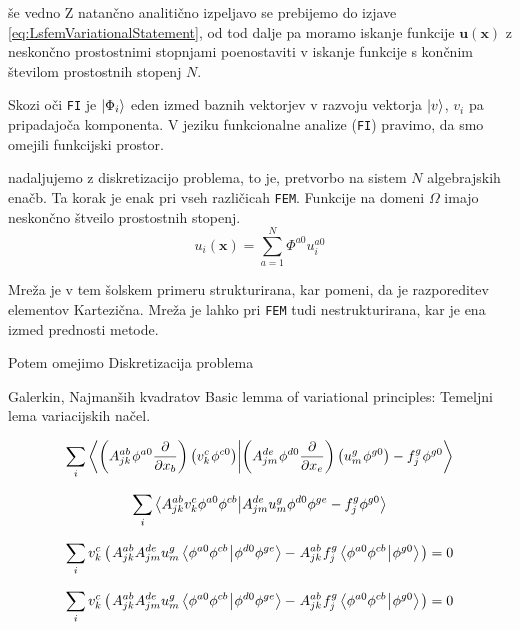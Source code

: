 še vedno  Z natančno analitično izpeljavo se prebijemo do izjave \eqref{eq:LsfemVariationalStatement}, od tod dalje pa moramo iskanje funkcije $\mathbf{u(x)}$ z neskončno prostostnimi stopnjami poenostaviti v iskanje funkcije s končnim številom prostostnih stopenj $N$. 

Skozi oči \texttt{FI} je $\ket{\Phi_i}$ eden izmed baznih vektorjev v razvoju vektorja $\ket{v}$, $v_i$ pa pripadajoča komponenta.
V jeziku funkcionalne analize (\texttt{FI}) pravimo, da smo omejili funkcijski prostor.

nadaljujemo z diskretizacijo problema, to je, pretvorbo na sistem $N$ algebrajskih enačb. Ta korak je enak pri vseh različicah \texttt{FEM}. Funkcije na domeni $\Omega$ imajo neskončno štveilo prostostnih stopenj. 
\begin{equation}
    u_i(\mathbf{x}) = \sum_{a = 1}^N \Phi^{a0} u^{a0}_i
\end{equation}

Mreža je v tem šolskem primeru strukturirana, kar pomeni, da je razporeditev elementov Kartezična. Mreža je lahko pri \texttt{FEM} tudi nestrukturirana, kar je ena izmed prednosti metode.

Potem omejimo Diskretizacija problema 

Galerkin, Najmanših kvadratov \cite{JiangB-LSFEM}
Basic lemma of variational principles: Temeljni lema variacijskih načel.


\begin{equation}
   \sum_i \bra{\left(A^{ab}_{jk} \mkern1mu \phi^{a0} \frac{\partial}{\partial x_b}\right) \left(v^c_k \mkern1mu \phi^{c0}\right)}\ket{\left(A^{de}_{jm} \mkern1mu \phi^{d0} \frac{\partial}{\partial x_e}\right) \left(u^g_m \mkern1mu \phi^{g0}\right) - f^g_j \mkern1mu \phi^{g0}}
\end{equation}

\begin{equation}
   \sum_i \bra{A^{ab}_{jk} v^c_k \phi^{a0} \phi^{cb}}\ket{A^{de}_{jm} u^g_m \phi^{d0} \phi^{ge} - f^g_j \phi^{g0}}
\end{equation}

\begin{equation}
   \sum_i v^c_k \left( \mkern2mu A^{ab}_{jk} A^{de}_{jm} u^g_m \bra{\phi^{a0} \phi^{cb} \mkern1mu}\ket{\mkern1mu \phi^{d0} \phi^{ge}} - \mkern1mu A^{ab}_{jk} \mkern1mu f^g_j \bra{\phi^{a0} \phi^{cb} \mkern1mu}\ket{\mkern1mu \phi^{g0}} \mkern2mu \right) = 0
\end{equation}

\begin{equation}
   \sum_i v^c_k \left( \mkern2mu A^{ab}_{jk} A^{de}_{jm} u^g_m \bra{\phi^{a0} \phi^{cb} \mkern1mu}\ket{\mkern1mu \phi^{d0} \phi^{ge}} - \mkern1mu A^{ab}_{jk} \mkern1mu f^g_j \bra{\phi^{a0} \phi^{cb} \mkern1mu}\ket{\mkern1mu \phi^{g0}} \mkern2mu \right) = 0
\end{equation}
